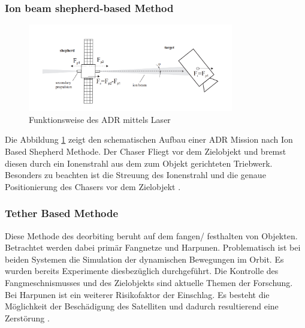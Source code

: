 \subsubsection{Ion beam shepherd-based Method}
	\begin{figure}[h]
			\centering
					\includegraphics[width=0.80\textwidth]{./graphics/ADR/Shepherd.PNG}
				\caption{Funktionsweise des ADR mittels Laser \cite{Bombardelli.2011}}
				\label{fig:Laser}
			\end{figure}

	
Die Abbildung \ref{fig:Laser} zeigt den schematischen Aufbau einer ADR Mission nach Ion Based Shepherd Methode. Der Chaser Fliegt vor dem Zielobjekt und bremst diesen durch ein Ionenstrahl aus dem zum Objekt gerichteten Triebwerk. Besonders zu beachten ist die Streuung des Ionenstrahl und die genaue Positionierung des Chasers vor dem Zielobjekt \cite{Mark.2019}.

\subsubsection{Tether Based Methode}
	
	Diese Methode des deorbiting beruht auf dem fangen/ festhalten von Objekten. Betrachtet werden dabei primär Fangnetze und Harpunen. Problematisch ist bei beiden Systemen die Simulation der dynamischen Bewegungen im Orbit. Es wurden bereits Experimente diesbezüglich durchgeführt. Die Kontrolle des Fangmeschnismusses und des Zielobjekts sind aktuelle Themen der Forschung. Bei Harpunen ist ein weiterer Risikofaktor der Einschlag. Es besteht die Möglichkeit der Beschädigung des Satelliten und dadurch resultierend eine Zerstörung \cite{Mark.2019}.
